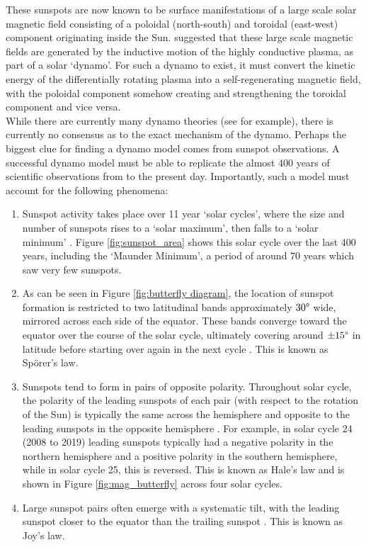 \documentclass[11pt,a4paper,onecolumn]{report}
\begin{document}
These sunspots are now known to be surface manifestations of a large scale solar
magnetic field consisting of a poloidal (north-south) and toroidal (east-west)
component originating inside the Sun. \citet{JosephLarmor1919} suggested that
these large scale magnetic fields are generated by the inductive motion of the highly
conductive plasma, as part of a solar `dynamo'. For such a dynamo to exist, it
must convert the kinetic energy of the differentially rotating plasma into a
self-regenerating magnetic field, with the poloidal component somehow creating
and strengthening the toroidal component and vice versa. \\



While there are currently many dynamo theories (see
\citealt{charbonneau_dynamo_2020} for example), there is currently no consensus as
to the exact mechanism of the dynamo. Perhaps the biggest clue for finding a
dynamo model comes from sunspot observations. A successful dynamo model must be
able to replicate the almost 400 years of scientific observations from
\citet{galilei_sunspots_2010} to the present day. Importantly, such a model
must account for the following phenomena:

\begin{enumerate}
  \item Sunspot activity takes place over 11 year `solar cycles', where the size
  and number of sunspots rises to a `solar maximum', then falls to a `solar
  minimum' \citep{schwabe_astronomische_1844}. Figure \ref{fig:sunspot_area}
  shows this solar cycle over the last 400 years, including the `Maunder
  Minimum', a period of around 70 years which saw very few sunspots.

  \item As can be seen in Figure \ref{fig:butterfly diagram}, the location of sunspot
  formation is restricted to two latitudinal bands approximately \(30\degree\)
  wide, mirrored across each side of the equator. These bands converge toward the equator
  over the course of the solar cycle, ultimately covering around \(\pm 15\degree\)
  in latitude before starting over again in the next cycle
  \citep{carrington_observations_1863}. This is known as Sp\"orer's law.

  \item Sunspots tend to form in pairs of opposite polarity. Throughout
  solar cycle, the polarity of the leading sunspots of each pair (with respect
  to the rotation of the Sun) is typically the same across the hemisphere and
  opposite to the leading sunspots in the opposite hemisphere
  \citep{hale_law_1925}. For example, in solar cycle 24 (2008 to 2019) leading
  sunspots typically had a negative polarity in the northern hemisphere and a
  positive polarity in the southern hemisphere, while in solar cycle 25, this is
  reversed. This is known as Hale's law and is shown in Figure
  \ref{fig:mag_butterfly} across four solar cycles.

  \item Large sunspot pairs often emerge with a systematic tilt, with the
  leading sunspot closer to the equator than the trailing sunspot
  \citep{hale_magnetic_1919}. This is known as Joy's law.
\end{enumerate}
\end{document}
